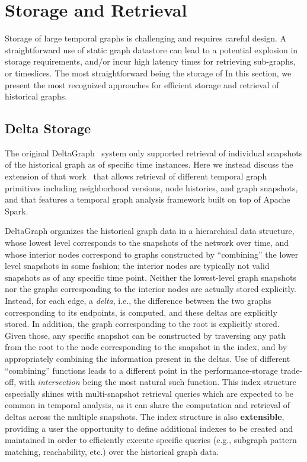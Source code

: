 \documentclass{svjour3}
\begin{document}
\section{Storage and Retrieval}

Storage of large temporal graphs is challenging and requires careful design. A straightforward use of static graph datastore can lead to a potential explosion in storage requirements, and/or incur high latency times for retrieving sub-graphs, or timeslices. The most straightforward being the storage of 
In this section, we present the most recognized approaches for efficient storage and retrieval of historical graphs.

\subsection{Delta Storage}
The original DeltaGraph~\cite{KhuranaD13:HistoricGraph} system only supported retrieval of individual snapshots of the historical graph as of specific time instances. Here we instead discuss the extension of that work~\cite{KhuranaD16:HistoricGraph} that allows retrieval of different temporal graph primitives including neighborhood versions, node histories, and graph snapshots, and that features a temporal graph analysis framework built on top of Apache Spark. 

\vspace{2mm}
 DeltaGraph organizes the historical graph data in a hierarchical data structure, whose lowest level corresponds
to the snapshots of the network over time, and whose interior nodes correspond to graphs constructed by ``combining''
the lower level snapshots in some fashion; the interior nodes are typically not valid snapshots as of any specific time point. Neither the lowest-level
graph snapshots nor the graphs corresponding to the interior nodes are actually stored explicitly. Instead, for each edge, a {\em delta}, i.e., the
difference between the two graphs corresponding to its endpoints, is computed, and these deltas are explicitly stored. In addition, the graph
corresponding to the root is explicitly stored. Given those, any specific snapshot can be constructed by traversing any
path from the root to the node corresponding to the snapshot in the index, and by appropriately combining the information present in the deltas.
Use of different ``combining'' functions leads to a different point in the performance-storage trade-off, with {\em intersection} being the most
natural such function.  This index structure especially shines with multi-snapshot retrieval queries which are expected to be common in temporal 
analysis, as it can share the computation and retrieval of deltas across the multiple snapshots.
The index structure is also {\bf extensible}, providing a user the opportunity to define additional 
indexes to be created and maintained in order to efficiently execute specific queries (e.g., subgraph pattern matching, reachability, etc.)
    over the historical graph data.
\end{document}
